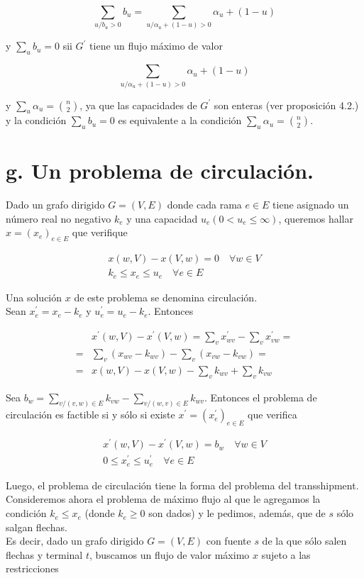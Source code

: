 \documentclass[10pt]{article}
\begin{document}
$$
\sum_{u / b_{u}>0} b_{u}=\sum_{u / \alpha_{u}+(1-u)>0} \alpha_{u}+(1-u)
$$

y $\sum_{u} b_{u}=0$ sii $G^{\prime}$ tiene un flujo máximo de valor

$$
\sum_{u / \alpha_{u}+(1-u)>0} \alpha_{u}+(1-u)
$$

y $\sum_{u} \alpha_{u}=\binom{n}{2}$, ya que las capacidades de $G^{\prime}$ son enteras (ver proposición 4.2.) y la condición $\sum_{u} b_{u}=0$ es equivalente a la condición $\sum_{u} \alpha_{u}=\binom{n}{2}$.

\section*{g. Un problema de circulación.}
Dado un grafo dirigido $G=(V, E)$ donde cada rama $e \in E$ tiene asignado un número real no negativo $k_{e}$ y una capacidad $u_{e}\left(0<u_{e} \leq \infty\right)$, queremos hallar $x=\left(x_{e}\right)_{e \in E}$ que verifique

$$
\begin{array}{r}
x(w, V)-x(V, w)=0 \quad \forall w \in V \\
k_{e} \leq x_{e} \leq u_{e} \quad \forall e \in E
\end{array}
$$

Una solución $x$ de este problema se denomina circulación.\\
Sean $x_{e}^{\prime}=x_{e}-k_{e}$ y $u_{e}^{\prime}=u_{e}-k_{e}$. Entonces

$$
\begin{aligned}
& x^{\prime}(w, V)-x^{\prime}(V, w)=\sum_{v} x_{w v}^{\prime}-\sum_{v} x_{v w}^{\prime}= \\
= & \sum_{v}\left(x_{w v}-k_{w v}\right)-\sum_{v}\left(x_{v w}-k_{v w}\right)= \\
= & x(w, V)-x(V, w)-\sum_{v} k_{w v}+\sum_{v} k_{v w}
\end{aligned}
$$

Sea $b_{w}=\sum_{v /(v, w) \in E} k_{v w}-\sum_{v /(w, v) \in E} k_{w v}$. Entonces el problema de circulación es factible si y sólo si existe $x^{\prime}=\left(x_{e}^{\prime}\right)_{e \in E}$ que verifica

$$
\begin{gathered}
x^{\prime}(w, V)-x^{\prime}(V, w)=b_{w} \quad \forall w \in V \\
0 \leq x_{e}^{\prime} \leq u_{e}^{\prime} \quad \forall e \in E
\end{gathered}
$$

Luego, el problema de circulación tiene la forma del problema del transshipment.\\
Consideremos ahora el problema de máximo flujo al que le agregamos la condición $k_{e} \leq x_{e}$ (donde $k_{e} \geq 0$ son dados) y le pedimos, además, que de $s$ sólo salgan flechas.\\
Es decir, dado un grafo dirigido $G=(V, E)$ con fuente $s$ de la que sólo salen flechas y terminal $t$, buscamos un flujo de valor máximo $x$ sujeto a las restricciones
\end{document}
